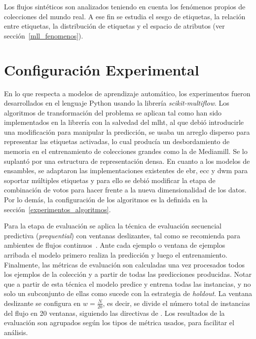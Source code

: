 Los flujos sintéticos son analizados teniendo en cuenta los fenómenos propios de
colecciones del mundo real. A ese fin se estudia el sesgo de etiquetas, la
relación entre etiquetas, la distribución de etiquetas y el espacio de atributos
(ver sección~\ref{mll_fenomenos}).

\section{Configuración Experimental}

En lo que respecta a modelos de aprendizaje automático, los experimentos fueron
desarrollados en el lenguaje Python usando la librería
\textit{scikit-multiflow}. Los algoritmos de transformación del problema se
aplican tal como han sido implementados en la librería con la salvedad del
\acrshort{mlht}, al que debió introducirle una modificación para manipular la
predicción, se usaba un arreglo disperso para representar las etiquetas
activadas, lo cual producía un desbordamiento de memoria en el entrenamiento de
colecciones grandes como la de Mediamill. Se lo suplantó por una estructura de
representación densa. En cuanto a los modelos de ensambles, se adaptaron las
implementaciones existentes de \acrshort{ebr}, \acrshort{ecc} y \acrshort{dwm}
para soportar múltiples etiquetas y para ello se debió modificar la etapa de
combinación de votos para hacer frente a la nueva dimensionalidad de los datos.
Por lo demás, la configuración de los algoritmos es la definida en la
sección~\ref{experimentos_algoritmos}.

Para la etapa de evaluación se aplica la técnica de evaluación secuencial
predictiva (\textit{prequential}) con ventanas deslizantes, tal como se
recomienda para ambientes de flujos continuos~\cite{gama_evaluating_2013}. Ante
cada ejemplo o ventana de ejemplos arribada el modelo primero realiza la
predicción y luego el entrenamiento. Finalmente, las métricas de evaluación son
calculadas una vez procesados todos los ejemplos de la colección y a partir de
todas las predicciones producidas.  Notar que a partir de esta técnica el modelo
predice y entrena todas las instancias, y no solo un subconjunto de ellas como
sucede con la estrategia de \textit{holdout}. La ventana deslizante se configura
en $w = \frac{N}{20}$, es decir, se divide el número total de instancias del
flujo en 20 ventanas, siguiendo las directivas de \textcite{read_scalable_2012}.
Los resultados de la evaluación son agrupados según los tipos de métrica usados,
para facilitar el análisis.

